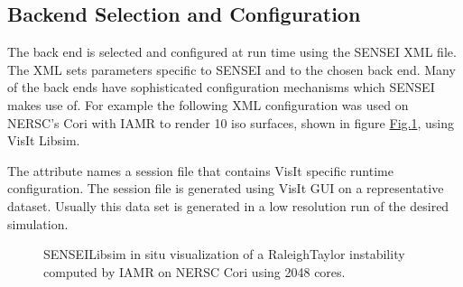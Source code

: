 \documentclass[letterpaper,10pt,english]{sphinxmanual}
\begin{document}
\subsection{Back\sphinxhyphen{}end Selection and Configuration}
\label{\detokenize{Visualization:back-end-selection-and-configuration}}
\sphinxAtStartPar
The back end is selected and configured at run time using the SENSEI XML file.
The XML sets parameters specific to SENSEI and to the chosen back end. Many of
the back ends have sophisticated configuration mechanisms which SENSEI makes
use of.  For example the following XML configuration was used on NERSC’s Cori
with IAMR to render 10 iso surfaces, shown in figure \hyperref[\detokenize{Visualization:rt-visit}]{Fig.\@ \ref{\detokenize{Visualization:rt-visit}}}, using
VisIt Libsim.

\begin{sphinxVerbatim}[commandchars=\\\{\}]
     
      
     
\end{sphinxVerbatim}

\sphinxAtStartPar
The  attribute names a session file that contains VisIt specific
runtime configuration. The session file is generated using VisIt GUI on a
representative dataset. Usually this data set is generated in a low resolution
run of the desired simulation.

\begin{figure}[htbp]
\centering
\capstart

\noindent{}
\caption{SENSEI\sphinxhyphen{}Libsim in situ visualization of a Raleigh\sphinxhyphen{}Taylor instability computed
by IAMR on NERSC Cori using 2048 cores.}\label{\detokenize{Visualization:id11}}\label{\detokenize{Visualization:rt-visit}}\end{figure}
\end{document}
